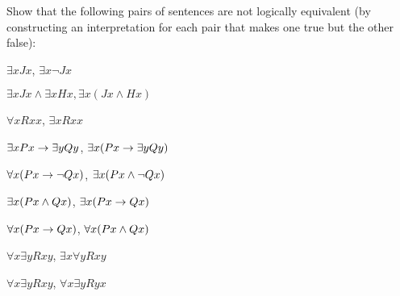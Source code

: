 
\problempart
\label{pr.NotEquiv}
Show that the following pairs of sentences are not logically equivalent (by constructing an interpretation for each pair that makes one true but the other false):
\begin{earg}
\item $\exists x Jx$, $\exists x \lnot Jx$
\item $\exists x Jx \land \exists x Hx, \exists x(Jx \land Hx)$
\item $\forall x Rxx$, $\exists x Rxx$
\item $\exists x Px \rightarrow \exists yQy$, $\exists x (Px \rightarrow \exists yQy)$
\item $\forall x(Px \rightarrow \neg Qx)$, $\exists x(Px \wedge \neg Qx)$
\item $\exists x(Px \wedge Qx)$, $\exists x(Px \rightarrow Qx)$
\item $\forall x(Px\rightarrow Qx)$, $\forall x(Px \wedge Qx)$
\item $\forall x\exists y Rxy$, $\exists x\forall y Rxy$
\item $\forall x\exists y Rxy$, $\forall x\exists y Ryx$
\end{earg}



